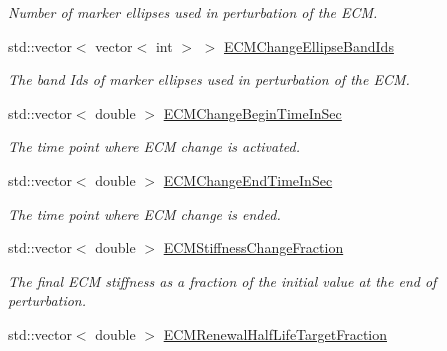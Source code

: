 \begin{DoxyCompactItemize}
\begin{DoxyCompactList}\small\item\em Number of marker ellipses used in perturbation of the E\+C\+M. \end{DoxyCompactList}\item 
\hypertarget{classSimulation_a505238cc725ac80e5fe265a698135d30}{}std\+::vector$<$ vector$<$ int $>$ $>$ \hyperlink{classSimulation_a505238cc725ac80e5fe265a698135d30}{E\+C\+M\+Change\+Ellipse\+Band\+Ids}\label{classSimulation_a505238cc725ac80e5fe265a698135d30}

\begin{DoxyCompactList}\small\item\em The band Ids of marker ellipses used in perturbation of the E\+C\+M. \end{DoxyCompactList}\item 
\hypertarget{classSimulation_a974c4132b507462e193a8b7d4fc852d4}{}std\+::vector$<$ double $>$ \hyperlink{classSimulation_a974c4132b507462e193a8b7d4fc852d4}{E\+C\+M\+Change\+Begin\+Time\+In\+Sec}\label{classSimulation_a974c4132b507462e193a8b7d4fc852d4}

\begin{DoxyCompactList}\small\item\em The time point where E\+C\+M change is activated. \end{DoxyCompactList}\item 
\hypertarget{classSimulation_a1d912ab9d070b8fc79363b27cdd73928}{}std\+::vector$<$ double $>$ \hyperlink{classSimulation_a1d912ab9d070b8fc79363b27cdd73928}{E\+C\+M\+Change\+End\+Time\+In\+Sec}\label{classSimulation_a1d912ab9d070b8fc79363b27cdd73928}

\begin{DoxyCompactList}\small\item\em The time point where E\+C\+M change is ended. \end{DoxyCompactList}\item 
\hypertarget{classSimulation_a66db5546dcae7e908e950bd066cce4b8}{}std\+::vector$<$ double $>$ \hyperlink{classSimulation_a66db5546dcae7e908e950bd066cce4b8}{E\+C\+M\+Stiffness\+Change\+Fraction}\label{classSimulation_a66db5546dcae7e908e950bd066cce4b8}

\begin{DoxyCompactList}\small\item\em The final E\+C\+M stiffness as a fraction of the initial value at the end of perturbation. \end{DoxyCompactList}\item 
\hypertarget{classSimulation_abe203bfe372b8abc3af084c8c5aa7cec}{}std\+::vector$<$ double $>$ \hyperlink{classSimulation_abe203bfe372b8abc3af084c8c5aa7cec}{E\+C\+M\+Renewal\+Half\+Life\+Target\+Fraction}\label{classSimulation_abe203bfe372b8abc3af084c8c5aa7cec}


\end{DoxyCompactItemize}
